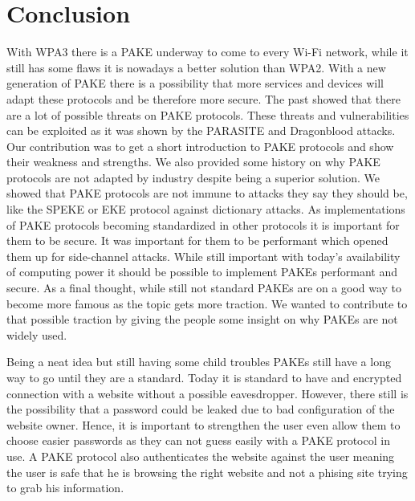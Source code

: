 \documentclass[journal]{IEEEtran}
\begin{document}
\section{Conclusion}
With WPA3 there is a PAKE underway to come to every Wi-Fi network, while it still has some flaws it is nowadays a better solution than WPA2.
With a new generation of PAKE there is a possibility that more services and devices will adapt these protocols and be therefore more secure.
The past showed that there are a lot of possible threats on PAKE protocols.
These threats and vulnerabilities can be exploited as it was shown by the PARASITE and Dragonblood attacks.
Our contribution was to get a short introduction to PAKE protocols and show their weakness and strengths. 
We also provided some history on why PAKE protocols are not adapted by industry despite being a superior solution.
We showed that PAKE protocols are not immune to attacks they say they should be, like the SPEKE or EKE protocol against dictionary attacks.
As implementations of PAKE protocols becoming standardized in other protocols it is important for them to be secure.
It was important for them to be performant which opened them up for side-channel attacks. While still important with today's availability of computing power it should be possible to implement PAKEs performant and secure. 
As a final thought, while still not standard PAKEs are on a good way to become more famous as the topic gets more traction.
We wanted to contribute to that possible traction by giving the people some insight on why PAKEs are not widely used.  

Being a neat idea but still having some child troubles PAKEs still have a long way to go until they are a standard.
Today it is standard to have and encrypted connection with a website without a possible eavesdropper. However, there still is the possibility that a password could be leaked due to bad configuration of the website owner.
Hence, it is important to strengthen the user even allow them to choose easier passwords as they can not guess easily with a PAKE protocol in use.
A PAKE protocol also authenticates the website against the user meaning the user is safe that he is browsing the right website and not a phising site trying to grab his information.
\end{document}
